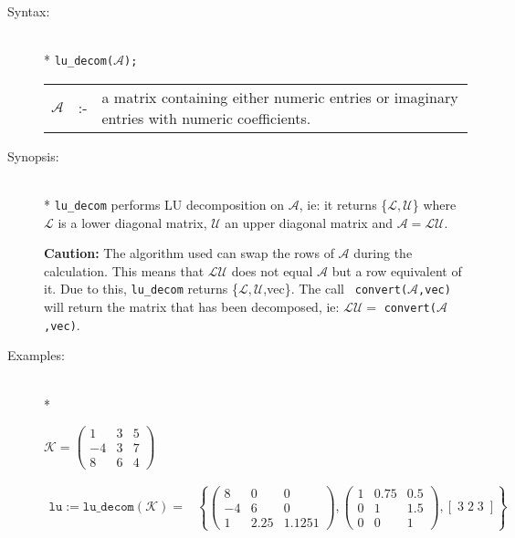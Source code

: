 \begin{description}
\item[Syntax:]\mbox{}\\*
\texttt{lu\_decom($\mathcal{A}$);}\\[2mm]
\begin{tabular}{l l l}
$\mathcal{A}$ &:-& \parbox[t]{.848\linewidth}{a matrix containing either 
numeric entries or imaginary entries with numeric coefficients.}
\end{tabular}

\item[Synopsis:]\mbox{}\\*
  \texttt{lu\_decom} performs LU decomposition on $\mathcal{A}$, ie: it returns
  \{$\mathcal{L,U}$\} where $\mathcal{L}$ is a lower diagonal matrix, $\mathcal{U}$ an
  upper diagonal matrix and $\mathcal{A} = \mathcal{LU}$.

\textbf{Caution:}
  The algorithm used can swap the rows of $\mathcal{A}$ during the calculation. This
  means that $\mathcal{LU}$ does not equal $\mathcal{A}$ but a row equivalent of it. Due
  to this, \texttt{lu\_decom} returns \{$\mathcal{L,U}$,vec\}. The call {\tt
  convert($\mathcal{A}$,vec)} will return the matrix that has been decomposed, ie:
  $\mathcal{LU} = $ \texttt{convert($\mathcal{A}$,vec)}.

\item[Examples:]\mbox{}\\*
\begin{flushleft}
\begin{math}  
\mathcal{K} = \begin{pmatrix} 1 & 3 & 5 \\ -4 & 3 & 7 \\ 8 & 6 & 4 \end{pmatrix}
\end{math}  
\end{flushleft}

\begin{align*}  
\texttt{lu} := \texttt{lu\_decom}(\mathcal{K}) = &
\left\{ 
        \begin{pmatrix} 8 & 0 & 0 \\ -4 & 6 & 0 \\ 1 & 2.25 & 1.125 1 \end{pmatrix}, 
        \begin{pmatrix} 1 & 0.75 & 0.5 \\ 0 & 1 & 1.5 \\ 0 & 0 & 1 \end{pmatrix}, 
	[\; 3 \; 2 \; 3 \; ]
\right\} 
\end{align*}  


\end{description}
